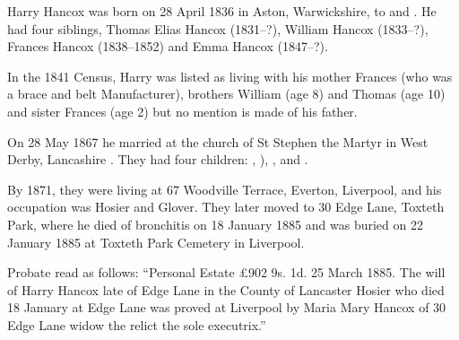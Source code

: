 
Harry Hancox was born on 28 April 1836 in Aston, Warwickshire, to  and .
He had four siblings, Thomas Elias Hancox (1831--?), William Hancox (1833--?), Frances Hancox (1838--1852) and Emma Hancox (1847--?). 

In the 1841 Census, Harry was listed as living with his mother Frances (who was a brace and belt Manufacturer), brothers William (age 8) and Thomas (age 10) and sister Frances (age 2) but no mention is made of his father. \cite{HarryHancoxBirth}

On 28 May 1867 he married  at the church of St Stephen the Martyr in West Derby, Lancashire \cite{HarryHancoxMarriage}.  They had four children: , ), , and .

By 1871, they were living at 67 Woodville Terrace, Everton, Liverpool, and his occupation was Hosier and Glover.\cite{HarryHancoxOccupation}  They later moved to 30 Edge Lane, Toxteth Park, where he died of bronchitis\cite{HarryHancoxDeathCert} on 18 January 1885 \cite{HarryHancoxDeath} and was buried on 22 January 1885 at Toxteth Park Cemetery in Liverpool.\cite{HHGravestone}

Probate read as follows: ``Personal Estate \pounds 902 9s. 1d. 25 March 1885. The will of Harry Hancox late of Edge Lane in the County of Lancaster Hosier who died 18 January at Edge Lane was proved at Liverpool by Maria Mary Hancox of 30 Edge Lane widow the relict the sole executrix.''
